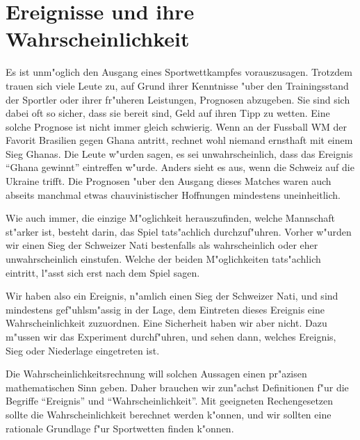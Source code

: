 %
%
%
\chapter{Ereignisse und ihre Wahrscheinlichkeit} \label{chapter-ereignisse-und-wahrscheinlichkeit}

Es ist unm"oglich den Ausgang eines Sportwettkampfes vorauszusagen.
Trotzdem trauen sich viele Leute zu, auf Grund ihrer Kenntnisse "uber den
Trainingsstand der Sportler oder ihrer fr"uheren Leistungen,
Prognosen abzugeben.
Sie sind sich dabei oft so sicher, dass sie bereit sind, Geld auf ihren Tipp
zu wetten.
Eine solche Prognose ist nicht immer gleich schwierig. Wenn an der
Fussball WM der Favorit Brasilien gegen Ghana antritt,
rechnet wohl niemand ernsthaft mit einem Sieg Ghanas. Die Leute w"urden
sagen, es sei unwahrscheinlich, dass das Ereignis ``Ghana gewinnt'' eintreffen
w"urde. Anders sieht es aus, wenn die Schweiz auf die Ukraine trifft.
Die Prognosen "uber den Ausgang dieses Matches waren auch abseits
manchmal etwas chauvinistischer Hoffnungen mindestens uneinheitlich.

Wie auch immer, die einzige M"oglichkeit herauszufinden, welche Mannschaft
st"arker ist, besteht darin, das Spiel tats"achlich durchzuf"uhren.
Vorher w"urden wir einen Sieg der Schweizer Nati bestenfalls als
wahrscheinlich oder eher unwahrscheinlich einstufen.
Welche der beiden M"oglichkeiten tats"achlich eintritt, l"asst sich
erst nach dem Spiel sagen.

Wir haben also ein Ereignis, n"amlich einen Sieg der Schweizer Nati,
und sind mindestens gef"uhlsm"assig in der Lage, dem Eintreten dieses
Ereignis eine Wahrscheinlichkeit zuzuordnen.
Eine Sicherheit haben wir aber nicht. 
Dazu m"ussen wir das Experiment durchf"uhren, und sehen dann,
welches Ereignis, Sieg oder Niederlage eingetreten ist.

Die Wahrscheinlichkeitsrechnung will solchen Aussagen einen pr"azisen
mathematischen Sinn geben. Daher brauchen wir zun"achst Definitionen
f"ur die Begriffe ``Ereignis'' und ``Wahrscheinlichkeit''.  Mit geeigneten
Rechengesetzen sollte die Wahrscheinlichkeit berechnet werden k"onnen,
und wir sollten eine rationale Grundlage f"ur Sportwetten finden k"onnen.

